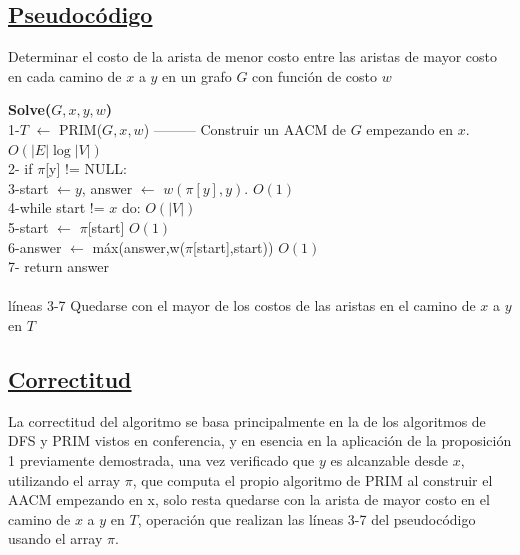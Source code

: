 \documentclass{article}
\begin{document}
    \subsection{\underline{Pseudoc\'odigo}}
    \begin{algorithm}
        \caption{Determinar el costo de la arista de menor costo entre las aristas de mayor costo en cada camino de $x$ a $y$ en un grafo $G$ con funci\'on de costo $w$}
        \textbf{Solve($G,x,y,w$)\\} 
        1-\hspace*{1em}$T$ $\leftarrow$ PRIM($G,x,w$) --------- Construir un AACM de $G$ empezando en $x$. $O(|E|\log{|V|})$\\
        2-\hspace*{1em} if $\pi$[y] != NULL:\\
        3-\hspace*{2em}start $\leftarrow y$, answer $\leftarrow$ $w(\pi[y],y)$. $O(1)$\\ 
        4-\hspace*{2em}while start != $x$ do:  $O(|V|)$\\
        5-\hspace*{3em}start $\leftarrow$ $\pi$[start] $O(1)$\\
        6-\hspace*{3em}answer $\leftarrow$ m\'ax(answer,w($\pi$[start],start)) $O(1)$\\
        7-\hspace*{2em} return answer\\\\
        
        l\'ineas 3-7 Quedarse con el mayor de los costos de las aristas en el camino de $x$ a $y$ en $T$
    \end{algorithm}

    \subsection{\underline{Correctitud}}

    La correctitud del algoritmo se basa principalmente en la de los algoritmos de DFS y PRIM vistos en conferencia, y en esencia en 
    la aplicaci\'on de la proposici\'on 1 previamente demostrada, una vez verificado que $y$ es alcanzable desde $x$, utilizando el array 
    $\pi$, que computa el propio algoritmo de PRIM al construir el AACM empezando en x, solo resta quedarse con la arista de mayor costo 
    en el camino de $x$ a $y$ en $T$, operaci\'on que realizan las l\'ineas 3-7 del pseudoc\'odigo usando el array $\pi$.
\end{document}
